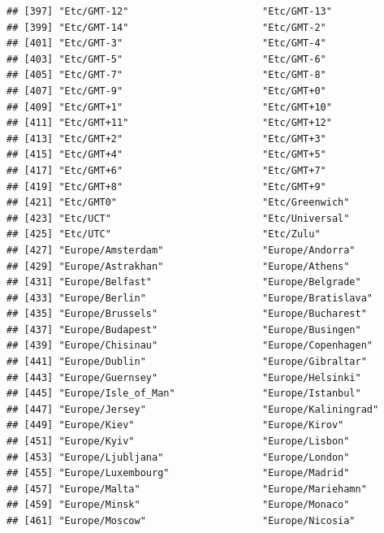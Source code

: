 \documentclass[
]{book}
\begin{document}
\begin{verbatim}
## [397] "Etc/GMT-12"                       "Etc/GMT-13"                      
## [399] "Etc/GMT-14"                       "Etc/GMT-2"                       
## [401] "Etc/GMT-3"                        "Etc/GMT-4"                       
## [403] "Etc/GMT-5"                        "Etc/GMT-6"                       
## [405] "Etc/GMT-7"                        "Etc/GMT-8"                       
## [407] "Etc/GMT-9"                        "Etc/GMT+0"                       
## [409] "Etc/GMT+1"                        "Etc/GMT+10"                      
## [411] "Etc/GMT+11"                       "Etc/GMT+12"                      
## [413] "Etc/GMT+2"                        "Etc/GMT+3"                       
## [415] "Etc/GMT+4"                        "Etc/GMT+5"                       
## [417] "Etc/GMT+6"                        "Etc/GMT+7"                       
## [419] "Etc/GMT+8"                        "Etc/GMT+9"                       
## [421] "Etc/GMT0"                         "Etc/Greenwich"                   
## [423] "Etc/UCT"                          "Etc/Universal"                   
## [425] "Etc/UTC"                          "Etc/Zulu"                        
## [427] "Europe/Amsterdam"                 "Europe/Andorra"                  
## [429] "Europe/Astrakhan"                 "Europe/Athens"                   
## [431] "Europe/Belfast"                   "Europe/Belgrade"                 
## [433] "Europe/Berlin"                    "Europe/Bratislava"               
## [435] "Europe/Brussels"                  "Europe/Bucharest"                
## [437] "Europe/Budapest"                  "Europe/Busingen"                 
## [439] "Europe/Chisinau"                  "Europe/Copenhagen"               
## [441] "Europe/Dublin"                    "Europe/Gibraltar"                
## [443] "Europe/Guernsey"                  "Europe/Helsinki"                 
## [445] "Europe/Isle_of_Man"               "Europe/Istanbul"                 
## [447] "Europe/Jersey"                    "Europe/Kaliningrad"              
## [449] "Europe/Kiev"                      "Europe/Kirov"                    
## [451] "Europe/Kyiv"                      "Europe/Lisbon"                   
## [453] "Europe/Ljubljana"                 "Europe/London"                   
## [455] "Europe/Luxembourg"                "Europe/Madrid"                   
## [457] "Europe/Malta"                     "Europe/Mariehamn"                
## [459] "Europe/Minsk"                     "Europe/Monaco"                   
## [461] "Europe/Moscow"                    "Europe/Nicosia"                  

\end{verbatim}
\end{document}
